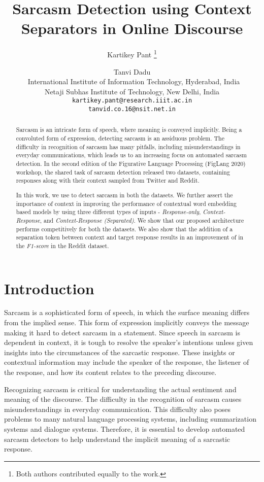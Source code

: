 \documentclass[11pt,a4paper]{article}
\title{Sarcasm Detection using Context Separators in Online Discourse}
\author{
    Kartikey Pant \thanks{\hspace{2 mm} Both authors contributed equally to the work.} \and Tanvi Dadu \footnotemark[1] \\\
    International Institute of Information Technology, Hyderabad, India \\
    Netaji Subhas Institute of Technology, New Delhi, India \\
    {\tt kartikey.pant@research.iiit.ac.in} \\
    {\tt tanvid.co.16@nsit.net.in} \\
}
\date{}
\begin{document}
\maketitle
\begin{abstract}
Sarcasm is an intricate form of speech, where meaning is conveyed implicitly. Being a convoluted form of expression, detecting sarcasm is an assiduous problem. The difficulty in recognition of sarcasm has many pitfalls, including misunderstandings in everyday communications, which leads us to an increasing focus on automated sarcasm detection. In the second edition of the Figurative Language Processing (FigLang 2020) workshop, the shared task of sarcasm detection released two datasets, containing responses along with their context sampled from Twitter and Reddit. 

In this work, we use  to detect sarcasm in both the datasets. We further assert the importance of context in improving the performance of contextual word embedding based models by using three different types of inputs - \textit{Response-only}, \textit{Context-Response}, and \textit{Context-Response (Separated)}. We show that our proposed architecture performs competitively for both the datasets. We also show that the addition of a separation token between context and target response results in an improvement of  in the \textit{F1-score} in the Reddit dataset.

\end{abstract}


\section{Introduction}

Sarcasm is a sophisticated form of speech, in which the surface meaning differs from the implied sense. This form of expression implicitly conveys the message making it hard to detect sarcasm in a statement. Since speech in sarcasm is dependent in context, it is tough to resolve the speaker’s intentions unless given insights into the circumstances of the sarcastic response. These insights or contextual information may include the speaker of the response, the listener of the response, and how its content relates to the preceding discourse.

Recognizing sarcasm is critical for understanding the actual sentiment and meaning of the discourse. The difficulty in the recognition of sarcasm causes misunderstandings in everyday communication. This difficulty also poses problems to many natural language processing systems, including summarization systems and dialogue systems. Therefore, it is essential to develop automated sarcasm detectors to help understand the implicit meaning of a sarcastic response.
\end{document}
